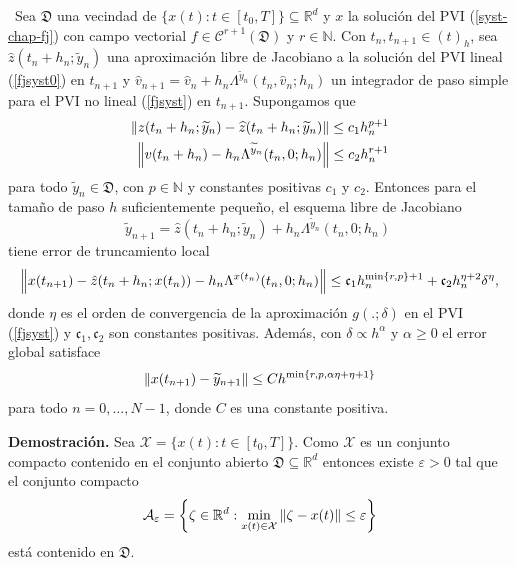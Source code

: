 \begin{theorem} \label{theorem:fj-llrk-convergence}
\cite{naranjo2023jacobian}~Sea $\mathfrak{D}$ una vecindad de $\{x(t):t\in [t_0,T]\} \subseteq \mathbb{R}^{d}$ y $x$ la solución del PVI (\ref{syst-chap-fj}) con campo vectorial $f\in \mathcal{C}^{r+1}(\mathfrak{D})$ y $r \in \mathbb{N}$. Con $t_n,t_{n+1}\in (t)_h$, sea $\hat{z}(t_n+h_n;\widetilde{y}_n)$ una aproximación libre de Jacobiano a la solución del PVI lineal (\ref{fjsyst0}) en $t_{n+1}$ y  $\widehat{v}_{n+1}=\widehat{v}_n+h_n\Lambda^{\widetilde{y}_n}(t_n,\widehat{v}_n;h_n)$ un integrador de paso simple para el PVI no lineal (\ref{fjsyst}) en $t_{n+1}$. Supongamos que
\begin{align}
	\left\lVert z(t_n+h_n;\widetilde{y}_n)-\widehat{z}(t_n+h_n;\widetilde{y}_n) \right\rVert \leq c_1 h_n^{p+1} \\
	\left\lVert v(t_n+h_n)-h_n\Lambda^{\widetilde{y}_n}(t_n,0;h_n) \right\rVert\leq c_2 h_n^{r+1}  \label{ineq:bound32}
\end{align}
para todo $\widetilde{y}_n \in \mathfrak{D}$, con  $p \in \mathbb{N}$ y constantes positivas  $c_1$ y $c_2$. Entonces para el tamaño de paso $h$ suficientemente pequeño, el esquema libre de Jacobiano
\begin{equation*}
    \widetilde{y}_{n+1}= \hat{z}(t_n+h_n;\widetilde{y}_n)+h_n\Lambda^{\widetilde{y}_n}(t_n,0;h_n)\;
\end{equation*}
tiene error de truncamiento local
\begin{equation*}
    \left\lVert x(t_{n+1})-\hat{z}(t_n+h_n;x(t_n))-h_n\Lambda^{x(t_n)}(t_n,0;h_n) \right\rVert\leq \mathfrak{c}_1 h_n^{\min\{r,p\}+1} + \mathfrak{c}_2 h_n^{\eta+2}\delta^{\eta},
\end{equation*}
donde $\eta$ es el orden de convergencia de la aproximación $g(.;\delta)$ en el PVI (\ref{fjsyst}) y $\mathfrak{c}_1,\mathfrak{c}_2$ son constantes positivas. Además, con $\delta\propto h^{\alpha}$ y  $\alpha \geq 0$ el error global satisface
\begin{equation*}
    \left\lVert x(t_{n+1})-\widetilde{y}_{n+1} \right\rVert\leq Ch^{\min\{r,p,\alpha\eta+\eta+1\}}
\end{equation*}
para todo  $n=0,\ldots,N-1$, donde $C$ es una constante positiva.
\end{theorem}

\textbf{Demostración.}
Sea $\mathcal{X}=\{ x(t): t\in [t_0,T] \}$. Como $\mathcal{X}$ es un conjunto compacto contenido en el conjunto abierto $\mathfrak{D}\subseteq \mathbb{R}^d$ entonces existe $\varepsilon>0$ tal que el conjunto compacto
\begin{equation*}
    \mathcal{A}_{\varepsilon}=\left\{ \zeta \in\mathbb{R}^d: \min\limits_{x(t)\in \mathcal{X}}\left\lVert \zeta -x(t) \right\rVert\leq \varepsilon \right\}
\end{equation*}
está contenido en $\mathfrak{D}$.

